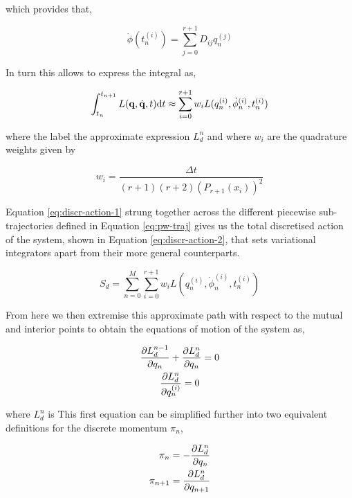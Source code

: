 which provides that,

\begin{equation}
  \dot\phi(t_n^{(i)}) = \sum_{j = 0}^{r + 1} D_{ij}q_n^{(j)}
\end{equation}

In turn this allows to express the integral as,

\begin{equation}
\label{eq:discr-action-1}
  \int_{t_n}^{t_{n + 1}} L(\vb q, \dot{\vb q}, t) \dd t \approx \sum_{i = 0}^{r + 1} w_i L(q_{n}^{(i)}, \dot\phi_{n}^{(i)}, t_{n}^{(i)})
\end{equation}

where the label the approximate expression $L_d^n$ and where $w_i$ are the quadrature weights given by

\begin{equation}
  w_i = \frac{\Delta t}{(r + 1)(r + 2)(P_{r + 1}(x_i))^2}
\end{equation}

Equation \eqref{eq:discr-action-1} strung together across the different piecewise sub-trajectories defined in Equation \eqref{eq:pw-traj} gives us the total discretised action of the system, shown in Equation \eqref{eq:discr-action-2}, that sets variational integrators  apart from their  more general counterparts. 

\begin{equation}
\label{eq:discr-action-2}
  S_d = \sum_{n = 0}^{M} \sum_{i = 0}^{r + 1} w_i L(q_{n}^{(i)}, \dot\phi_{n}^{(i)}, t_{n}^{(i)})
\end{equation}

From here we then extremise this approximate path with respect to the mutual and interior  points to obtain the equations of motion of the system as,

\begin{gather}
	\frac{\partial L_d^{n-1}}{\partial q_n} + \frac{\partial L_d^{n}}{\partial q_n} = 0 \\
	\label{eq:Ld-interior-eom} \frac{\partial L_d^{n}}{\partial q^{(i)}_n} = 0
\end{gather}

where $L_d^{n}$ is This first equation can be simplified further into two equivalent definitions for the discrete momentum \(\pi_n\),

\begin{align}
	\label{eq:pi-n} \pi_n &= -\frac{\partial L_d^{n}}{\partial q_n} \\
	\label{eq:pi-n+1} \pi_{n + 1} &= \frac{\partial L_d^{n}}{\partial q_{n + 1}}
\end{align}

